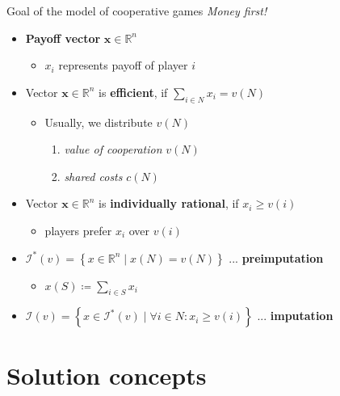 \documentclass{beamer}
\newcommand{\Rn}[1][n]{\mathbb{R}^{#1}}
\newcommand{\bx}{\textbf{x}}
\newcommand{\I}{\mathcal{I}}
\begin{document}

\begin{frame}{Goal of the model of cooperative games}
	\textit{Money first!}
	\vspace{0.3in}
	\begin{itemize}
	    \item \textbf{Payoff vector} $\bx \in \Rn$
	    \begin{itemize}
	        \item $x_i$ represents payoff of player $i$
	    \end{itemize}
	    \item Vector $\bx \in \Rn$ is \textbf{efficient}, if $\sum_{i \in N}x_i = v(N)$
	    \begin{itemize}
	        \item Usually, we distribute $v(N)$
            \begin{enumerate}
                \item \textit{value of cooperation} $v(N)$
                \item \textit{shared costs} $c(N)$
            \end{enumerate}
	    \end{itemize}
	    \item Vector $\bx \in \Rn$ is \textbf{individually rational}, if $x_i \geq v(i)$
	    \begin{itemize}
	        \item players prefer $x_i$ over $v(i)$
	    \end{itemize}
	    \end{itemize}
	    \vspace{0.2in}
	    \begin{itemize}
	    \item $\I^*(v) = \left\{x \in \Rn \mid x(N) = v(N) \right\}$ ... \textbf{preimputation}
	    \begin{itemize}
	        \item $x(S)\coloneqq \sum_{i \in S} x_i$
	    \end{itemize}
	    \item $\I(v) = \left\{x \in \I^*(v) \mid \forall i \in N: x_i \geq v(i)\right\}$ ... \textbf{imputation}
	\end{itemize}
\end{frame}


\section{Solution concepts}
\end{document}
